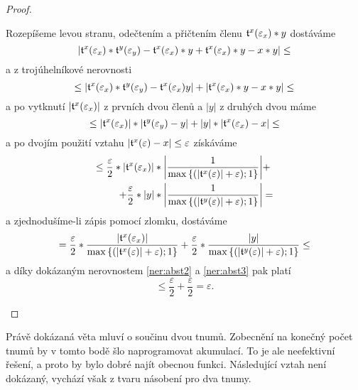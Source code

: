 \begin{theorem}
\begin{proof}
\begin{itemize}
{Rozepíšeme levou stranu, odečtením a přičtením členu $\mathfrak{t}^{x}(\varepsilon_x)*y$ dostáváme
\begin{equation}
|\mathfrak{t}^{x}(\varepsilon_x)*\mathfrak{t}^{y}(\varepsilon_y) - \mathfrak{t}^{x}(\varepsilon_x)*y + \mathfrak{t}^{x}(\varepsilon_x)*y - x*y|\leq
\end{equation}
a z trojúhelníkové nerovnosti
\begin{equation}
\leq|\mathfrak{t}^{x}(\varepsilon_x)*\mathfrak{t}^{y}(\varepsilon_y) - \mathfrak{t}^{x}(\varepsilon_x)y |+| \mathfrak{t}^{x}(\varepsilon_x)*y - x*y|\leq
\end{equation}
a po vytknutí $|\mathfrak{t}^{x}(\varepsilon_x)|$ z prvních dvou členů a $|y|$ z druhých dvou máme
\begin{equation}
\leq|\mathfrak{t}^{x}(\varepsilon_x)|*|\mathfrak{t}^{y}(\varepsilon_y) - y|+|y|*|\mathfrak{t}^{x}(\varepsilon_x) - x|\leq
\end{equation}
a po dvojím použití vztahu $|\mathfrak{t}^{x}(\varepsilon)-x|\leq\varepsilon$ získáváme
\begin{equation}
\begin{aligned}
\leq\frac{\varepsilon}{2}*|\mathfrak{t}^{x}(\varepsilon_x)|*\left|\frac{1}{\mathrm{max}\left\{(|\mathfrak{t}^{x}(\varepsilon)| + \varepsilon);1\right\}}\right|&+\\+\frac{\varepsilon}{2}*|y|*\left|\frac{1}{\mathrm{max}\left\{(|\mathfrak{t}^{y}(\varepsilon)| + \varepsilon);1\right\}}\right|&=
\end{aligned}
\end{equation}
a zjednodušíme-li zápis pomocí zlomku, dostáváme
\begin{equation}
= \frac{\varepsilon}{2}*\frac{\left|\mathfrak{t}^{x}(\varepsilon_x)\right|}{\mathrm{max}\left\{(|\mathfrak{t}^{x}(\varepsilon)| + \varepsilon);1\right\}}+\frac{\varepsilon}{2}*\frac{|y|}{\mathrm{max}\left\{(|\mathfrak{t}^{y}(\varepsilon)| + \varepsilon);1\right\}}\leq
\end{equation}
a díky dokázaným nerovnostem \eqref{ner:abst2} a \eqref{ner:abst3} pak platí
\begin{equation}
\leq\frac{\varepsilon}{2}+\frac{\varepsilon}{2}=\varepsilon.
\end{equation}}
\end{itemize}
\end{proof}
\end{theorem}

Právě dokázaná věta mluví o součinu dvou tnumů. Zobecnění na konečný počet tnumů by v tomto bodě šlo naprogramovat akumulací. To je ale neefektivní řešení, a proto by bylo dobré najít obecnou funkci. Následující vztah není dokázaný, vychází však z tvaru násobení pro dva tnumy.

